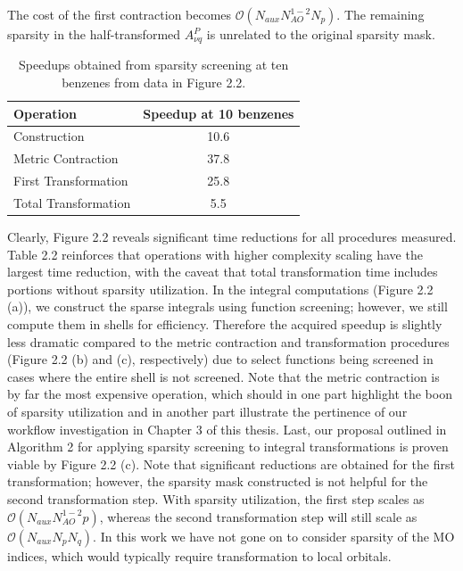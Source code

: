 \noindent The cost of the first contraction becomes $\mathcal{O}(N_{aux}N_{AO}^{1-2}N_p)$. 
The remaining sparsity in the half-transformed $A_{\nu q}^P$ is unrelated to the original sparsity mask.

\begingroup
\begin{table}[H]
\centering
\renewcommand{\baselinestretch}{1}
\caption{Speedups obtained from sparsity screening at ten benzenes from data in Figure 2.2.}
\begin{tabular}{l c}
\multicolumn{1}{l}{\textbf{Operation}} &
\multicolumn{1}{c}{\textbf{Speedup at 10 benzenes}} \\ 
\hline
Construction          & 10.6  \\          
Metric Contraction    & 37.8  \\          
First Transformation  & 25.8  \\          
Total Transformation  & 5.5  \\          
\end{tabular}
\end{table}
\endgroup


Clearly, Figure 2.2 reveals significant time reductions for all procedures measured.
Table 2.2 reinforces that operations with higher complexity scaling have the largest time
reduction, with the caveat that total transformation time includes portions without sparsity utilization.
In the integral computations (Figure 2.2 (a)), we construct the sparse integrals using
function screening; however, we still compute them in shells for efficiency.
Therefore the acquired speedup is slightly less dramatic compared to the metric contraction and
transformation procedures (Figure 2.2 (b) and (c), respectively) due to select functions being 
screened in cases where the entire shell is not screened. 
Note that the metric contraction is by far the most expensive operation, which should in one part
highlight the boon of sparsity utilization and in another part
illustrate the pertinence of our workflow investigation in Chapter 3 of this thesis.
Last, our proposal outlined in Algorithm 2 for applying sparsity screening to integral transformations
is proven viable by Figure 2.2 (c). Note that significant reductions are obtained for the
first transformation; however, the sparsity mask constructed is not helpful for the second transformation step.
With sparsity utilization, the first step scales as $\mathcal{O}(N_{aux}N_{AO}^{1-2}p)$,
whereas the second transformation step will still scale as $\mathcal{O}(N_{aux}N_pN_q)$.
In this work we have not gone on to consider sparsity of the MO indices, which would 
typically require transformation to local orbitals.


